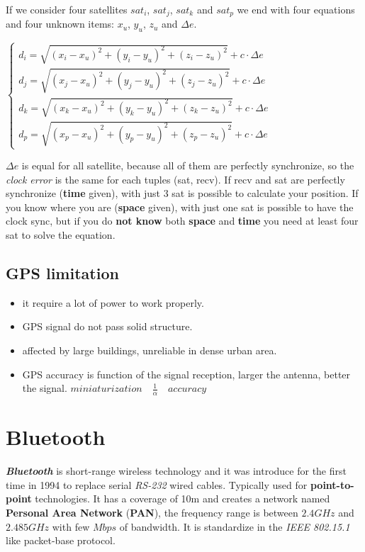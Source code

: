 If we consider four satellites $sat_i$, $sat_j$, $sat_k$ and $sat_p$ we end with four equations and four unknown items: $x_u$, $y_u$, $z_u$ and $\Delta e$.
\begin{center}
    \begin{math}
        \begin{cases}
            d_i = \sqrt{(x_i - x_u)^2 + (y_i - y_u)^2 + (z_i - z_u)^2} + c \cdot \Delta e \\
            d_j = \sqrt{(x_j - x_u)^2 + (y_j - y_u)^2 + (z_j - z_u)^2} + c \cdot \Delta e \\
            d_k = \sqrt{(x_k - x_u)^2 + (y_k - y_u)^2 + (z_k - z_u)^2} + c \cdot \Delta e \\
            d_p = \sqrt{(x_p - x_u)^2 + (y_p - y_u)^2 + (z_p - z_u)^2} + c \cdot \Delta e
        \end{cases}
    \end{math}
\end{center}
$\Delta e$ is equal for all satellite, because all of them are perfectly synchronize, so the \textit{clock error} is the same for each tuples (sat, recv). If recv and sat are perfectly synchronize (\textbf{time} given), with just 3 sat is possible to calculate your position. If you know where you are (\textbf{space} given), with just one sat is possible to have the clock sync, but if you do \textbf{not know} both \textbf{space} and \textbf{time} you need at least four sat to solve the equation.

\subsection{GPS limitation}
\begin{itemize}[nosep]
    \item it require a lot of power to work properly.
    \item GPS signal do not pass solid structure.
    \item affected by large buildings, unreliable in dense urban area.
    \item GPS accuracy is function of the signal reception, larger the antenna, better the signal. $miniaturization \quad \frac{1}{\alpha} \quad accuracy$
\end{itemize}

\newpage
\section{Bluetooth}
\textbf{\textit{Bluetooth}} is short-range wireless technology and it was introduce for the first time in 1994 to replace serial \textit{RS-232} wired cables. Typically used for \textbf{point-to-point} technologies. It has a coverage of 10m and creates a network named \textbf{Personal Area Network} (\textbf{PAN}), the frequency range is between $2.4GHz$ and $2.485GHz$ with few $Mbps$ of bandwidth. It is standardize in the \textit{IEEE 802.15.1} like packet-base protocol.

